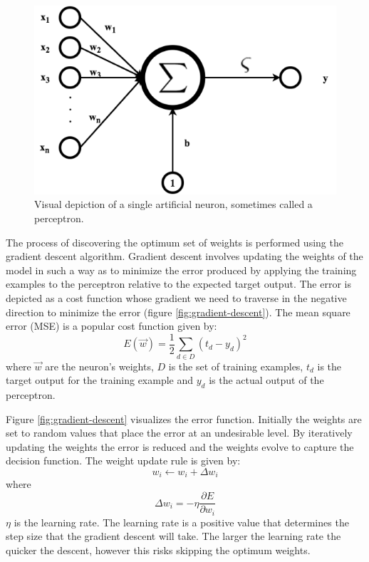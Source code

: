 \documentclass{article}
\begin{document}
	\begin{figure}
		\centering
		\includegraphics[max width=\textwidth]{perceptron}
		\caption{Visual depiction of a single artificial neuron, sometimes called a perceptron.}
		\label{fig:perceptron}
	\end{figure}
	
	The process of discovering the optimum set of weights is performed using the gradient descent algorithm. Gradient descent involves updating the weights of the model in such a way as to minimize the error produced by  applying the training examples to the perceptron relative to the expected target output. The error is depicted as a cost function whose gradient we need to traverse in the negative direction to minimize the error (figure \ref{fig:gradient-descent})\cite{Le15atutorial}. The mean square error (MSE) is a popular cost function\cite{Mitchell} given by:
	\begin{equation}
		E(\vec{w}) = \frac{1}{2} \sum_{d \in D} (t_d - y_d)^2
	\end{equation}
	where $\vec{w}$ are the neuron's weights, $D$ is the set of training examples, $t_d$ is the target output for the training example and $y_d$ is the actual output of the perceptron. 
	
	Figure \ref{fig:gradient-descent} visualizes the error function. Initially the weights are set to random values that place the error at an undesirable level. By iteratively updating the weights the error is reduced and the weights evolve to capture the decision function. The weight update rule is given by:
	\begin{equation}
		w_i \leftarrow w_i + \Delta w_i
	\end{equation}
	where
	\begin{equation}
		\Delta w_i = -\eta \frac{\partial E}{\partial w_i}
	\end{equation}
	$\eta$ is the learning rate. The learning rate is a positive value that determines the step size that the gradient descent will take. The larger the learning rate the quicker the descent, however this risks skipping the optimum weights.
	
\end{document}
